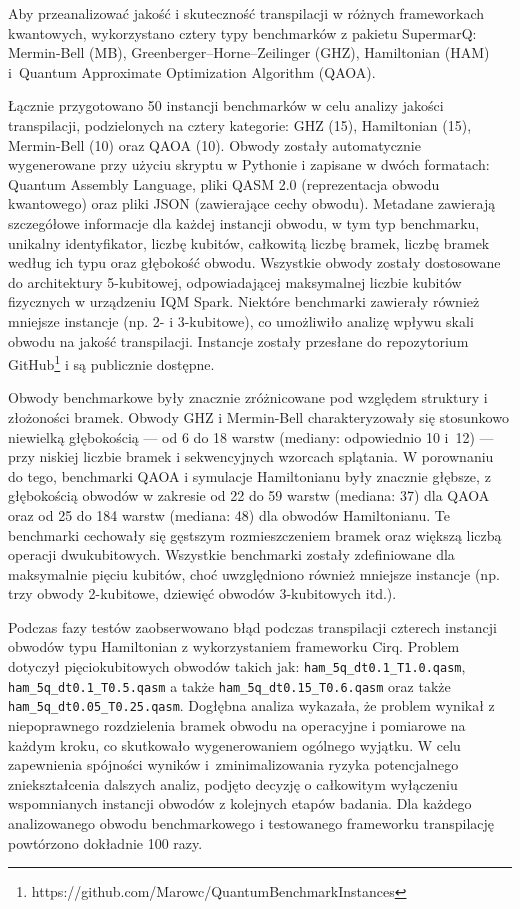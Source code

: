 Aby przeanalizować jakość i skuteczność transpilacji w różnych frameworkach kwantowych, wykorzystano cztery typy benchmarków z pakietu SupermarQ: Mermin-Bell (MB), Greenberger–Horne–Zeilinger (GHZ), Hamiltonian (HAM) i~Quantum Approximate Optimization Algorithm (QAOA).

Łącznie przygotowano 50 instancji benchmarków w celu analizy jakości transpilacji, podzielonych na cztery kategorie: GHZ (15), Hamiltonian (15), Mermin-Bell (10) oraz QAOA (10). Obwody zostały automatycznie wygenerowane przy użyciu skryptu w Pythonie i zapisane w dwóch formatach: Quantum Assembly Language, pliki QASM 2.0 (reprezentacja obwodu kwantowego) oraz pliki JSON (zawierające cechy obwodu). Metadane zawierają szczegółowe informacje dla każdej instancji obwodu, w tym typ benchmarku, unikalny identyfikator, liczbę kubitów, całkowitą liczbę bramek, liczbę bramek według  ich typu oraz głębokość obwodu.
%
Wszystkie obwody zostały dostosowane do architektury 5-kubitowej, odpowiadającej maksymalnej liczbie kubitów fizycznych w urządzeniu IQM Spark. Niektóre benchmarki zawierały również mniejsze instancje (np. 2- i 3-kubitowe), co umożliwiło analizę wpływu skali obwodu na jakość transpilacji. Instancje zostały przesłane do repozytorium GitHub\footnote{https://github.com/Marowc/QuantumBenchmarkInstances} i są publicznie dostępne.

Obwody benchmarkowe były znacznie zróżnicowane pod względem struktury i złożoności bramek. Obwody GHZ i Mermin-Bell charakteryzowały się stosunkowo niewielką głębokością — od 6 do 18 warstw (mediany: odpowiednio 10 i~12) — przy niskiej liczbie bramek i sekwencyjnych wzorcach splątania. W porownaniu do tego, benchmarki QAOA i symulacje Hamiltonianu były znacznie głębsze, z głębokością obwodów w zakresie od 22 do 59 warstw (mediana: 37) dla QAOA oraz od 25 do 184 warstw (mediana: 48) dla obwodów Hamiltonianu. Te benchmarki cechowały się gęstszym rozmieszczeniem bramek oraz większą liczbą operacji dwukubitowych. Wszystkie benchmarki zostały zdefiniowane dla maksymalnie pięciu kubitów, choć uwzględniono również mniejsze instancje (np. trzy obwody 2-kubitowe, dziewięć obwodów 3-kubitowych itd.). 

Podczas fazy testów zaobserwowano błąd podczas transpilacji czterech instancji obwodów typu Hamiltonian z wykorzystaniem frameworku Cirq. Problem dotyczył pięciokubitowych obwodów takich jak: \texttt{ham\_5q\_dt0.1\_T1.0.qasm}, \texttt{ham\_5q\_dt0.1\_T0.5.qasm} a także \texttt{ham\_5q\_dt0.15\_T0.6.qasm} oraz także \texttt{ham\_5q\_dt0.05\_T0.25.qasm}. Dogłębna analiza wykazała, że problem wynikał z niepoprawnego rozdzielenia bramek obwodu na operacyjne i pomiarowe na każdym kroku, co skutkowało wygenerowaniem ogólnego wyjątku. W celu zapewnienia spójności wyników i~zminimalizowania ryzyka potencjalnego zniekształcenia dalszych analiz, podjęto decyzję o całkowitym wyłączeniu wspomnianych instancji obwodów z kolejnych etapów badania. Dla każdego analizowanego obwodu benchmarkowego i testowanego frameworku transpilację powtórzono dokładnie 100 razy.

